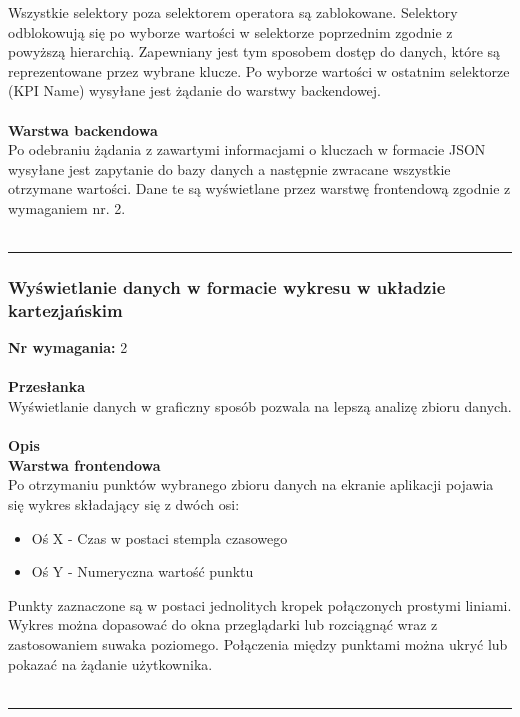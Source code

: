 \documentclass[eng,printmode]{mgr}
\begin{document}
Wszystkie selektory poza selektorem operatora są zablokowane. Selektory odblokowują się po wyborze wartości w selektorze poprzednim zgodnie z powyższą hierarchią. Zapewniany jest tym sposobem dostęp do danych, które są reprezentowane przez wybrane klucze. Po wyborze wartości w ostatnim selektorze (KPI Name) wysyłane jest żądanie do warstwy backendowej. 
\\\\
\textbf{Warstwa backendowa} \\
Po odebraniu żądania z zawartymi informacjami o kluczach w formacie JSON wysyłane jest zapytanie do bazy danych a następnie zwracane wszystkie otrzymane wartości. Dane te są wyświetlane przez warstwę frontendową zgodnie z wymaganiem nr. 2.
\\\\\noindent\rule{\textwidth}{2pt}
\subsubsection{Wyświetlanie danych w formacie wykresu w układzie kartezjańskim}
\textbf{Nr wymagania:} 2
\\\\
\textbf{Przesłanka}\\
Wyświetlanie danych w graficzny sposób pozwala na lepszą analizę zbioru danych.
\\\\
\textbf{Opis}\\
\textbf{Warstwa frontendowa} \\
Po otrzymaniu punktów wybranego zbioru danych na ekranie aplikacji pojawia się wykres składający się z dwóch osi:
\begin{itemize}
  \item Oś X - Czas w postaci stempla czasowego
  \item Oś Y - Numeryczna wartość punktu 
\end{itemize}
Punkty zaznaczone są w postaci jednolitych kropek połączonych prostymi liniami. Wykres można dopasować do okna przeglądarki lub rozciągnąć wraz z zastosowaniem suwaka poziomego. Połączenia między punktami można ukryć lub pokazać na żądanie użytkownika.
\\\\\noindent\rule{\textwidth}{2pt}
\end{document}

